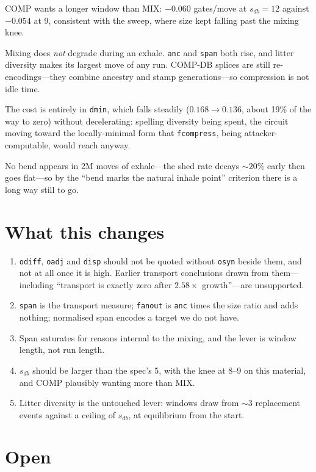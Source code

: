 \documentclass[11pt]{article}
\begin{document}
COMP wants a longer window than MIX: $-0.060$ gates/move at $s_{db}=12$ against
$-0.054$ at 9, consistent with the sweep, where size kept falling past the
mixing knee.

Mixing does \emph{not} degrade during an exhale. \texttt{anc} and \texttt{span}
both rise, and litter diversity makes its largest move of any run. COMP-DB
splices are still re-encodings---they combine ancestry and stamp
generations---so compression is not idle time.

The cost is entirely in \texttt{dmin}, which falls steadily ($0.168\to 0.136$,
about 19\% of the way to zero) without decelerating: spelling diversity being
spent, the circuit moving toward the locally-minimal form that
\texttt{fcompress}, being attacker-computable, would reach anyway.

No bend appears in 2M moves of exhale---the shed rate decays ${\sim}20\%$ early
then goes flat---so by the ``bend marks the natural inhale point'' criterion
there is a long way still to go.

\section{What this changes}

\begin{enumerate}
\item \texttt{odiff}, \texttt{oadj} and \texttt{disp} should not be quoted
without \texttt{osyn} beside them, and not at all once it is high. Earlier
transport conclusions drawn from them---including ``transport is exactly zero
after $2.58\times$ growth''---are unsupported.
\item \texttt{span} is the transport measure; \texttt{fanout} is \texttt{anc}
times the size ratio and adds nothing; normalised span encodes a target we do
not have.
\item Span saturates for reasons internal to the mixing, and the lever is
window length, not run length.
\item $s_{db}$ should be larger than the spec's 5, with the knee at 8--9 on this
material, and COMP plausibly wanting more than MIX.
\item Litter diversity is the untouched lever: windows draw from ${\sim}3$
replacement events against a ceiling of $s_{db}$, at equilibrium from the start.
\end{enumerate}

\section{Open}
\end{document}
